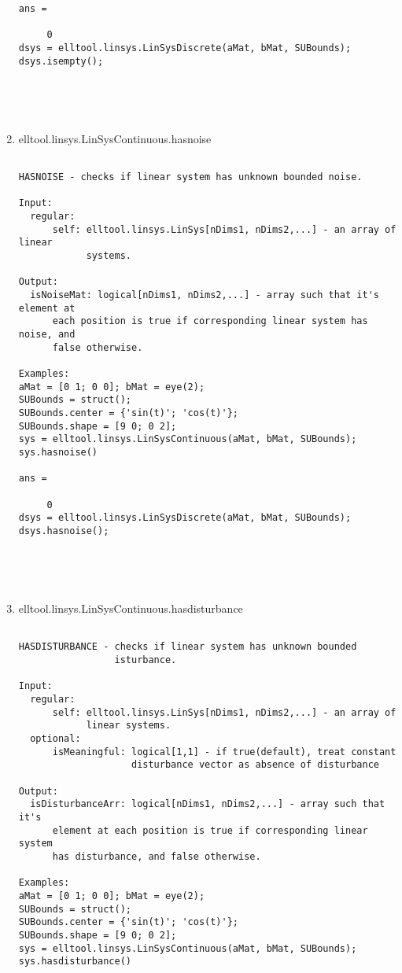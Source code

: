 \begin{enumerate}
\begin{lstlisting}
ans =

     0
dsys = elltool.linsys.LinSysDiscrete(aMat, bMat, SUBounds);
dsys.isempty();





\end{lstlisting}
\fontfamily{\familydefault}
\selectfont
\item {elltool.linsys.LinSysContinuous.hasnoise}
\selectfont
\begin{lstlisting}

HASNOISE - checks if linear system has unknown bounded noise.

Input:
  regular:
      self: elltool.linsys.LinSys[nDims1, nDims2,...] - an array of linear
            systems.

Output:
  isNoiseMat: logical[nDims1, nDims2,...] - array such that it's element at
      each position is true if corresponding linear system has noise, and
      false otherwise.

Examples:
aMat = [0 1; 0 0]; bMat = eye(2);
SUBounds = struct();
SUBounds.center = {'sin(t)'; 'cos(t)'};
SUBounds.shape = [9 0; 0 2];
sys = elltool.linsys.LinSysContinuous(aMat, bMat, SUBounds);
sys.hasnoise()

ans =

     0
dsys = elltool.linsys.LinSysDiscrete(aMat, bMat, SUBounds);
dsys.hasnoise();





\end{lstlisting}
\fontfamily{\familydefault}
\selectfont
\item {elltool.linsys.LinSysContinuous.hasdisturbance}
\selectfont
\begin{lstlisting}

HASDISTURBANCE - checks if linear system has unknown bounded
                 isturbance.

Input:
  regular:
      self: elltool.linsys.LinSys[nDims1, nDims2,...] - an array of
            linear systems.
  optional:
      isMeaningful: logical[1,1] - if true(default), treat constant
                    disturbance vector as absence of disturbance

Output:
  isDisturbanceArr: logical[nDims1, nDims2,...] - array such that it's
      element at each position is true if corresponding linear system
      has disturbance, and false otherwise.

Examples:
aMat = [0 1; 0 0]; bMat = eye(2);
SUBounds = struct();
SUBounds.center = {'sin(t)'; 'cos(t)'};
SUBounds.shape = [9 0; 0 2];
sys = elltool.linsys.LinSysContinuous(aMat, bMat, SUBounds);
sys.hasdisturbance()


\end{lstlisting}
\end{enumerate}

